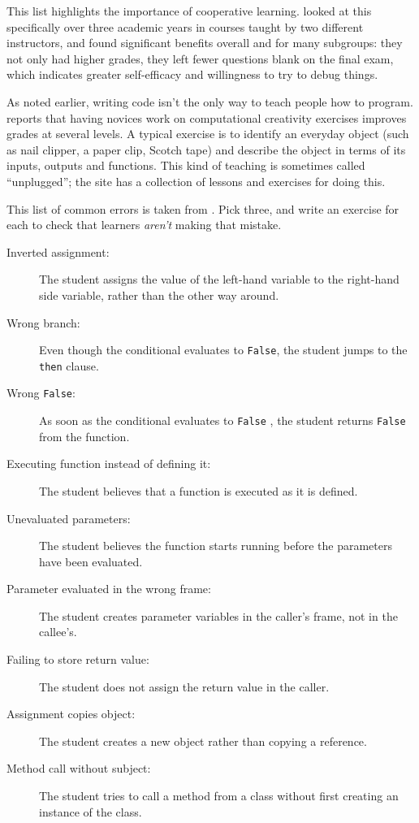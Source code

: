 This list highlights the importance of cooperative learning.
\cite{Beck2013} looked at this specifically over three academic years
in courses taught by two different instructors, and found significant
benefits overall and for many subgroups: they not only had higher
grades, they left fewer questions blank on the final exam, which
indicates greater self-efficacy and willingness to try to debug things.

As noted earlier, writing code isn't the only way to teach people how
to program. \cite{Shel2017} reports that having novices work on
computational creativity exercises improves grades at several
levels. A typical exercise is to identify an everyday object (such as
nail clipper, a paper clip, Scotch tape) and describe the object in
terms of its inputs, outputs and functions. This kind of teaching is
sometimes called ``unplugged''; the  site
has a collection of lessons and exercises for doing this.



This list of common errors is taken from \cite{Sirk2012}. Pick three,
and write an exercise for each to check that learners \emph{aren't} making
that mistake.

\begin{description}
\item[Inverted assignment:]
The student assigns the value of the left-hand variable to the
right-hand side variable, rather than the other way around.
\item[Wrong branch:]
Even though the conditional evaluates to \texttt{False}, the student jumps
to the \texttt{then} clause.
\item[Wrong \texttt{False}:]
As soon as the conditional evaluates to \texttt{False} , the student
returns \texttt{False} from the function.
\item[Executing function instead of defining it:]
The student believes that a function is executed as it is defined.
\item[Unevaluated parameters:]
The student believes the function starts running before the
parameters have been evaluated.
\item[Parameter evaluated in the wrong frame:]
The student creates parameter variables in the caller's frame, not
in the callee's.
\item[Failing to store return value:]
The student does not assign the return value in the caller.
\item[Assignment copies object:]
The student creates a new object rather than copying a reference.
\item[Method call without subject:]
The student tries to call a method from a class without first
creating an instance of the class.
\end{description}

